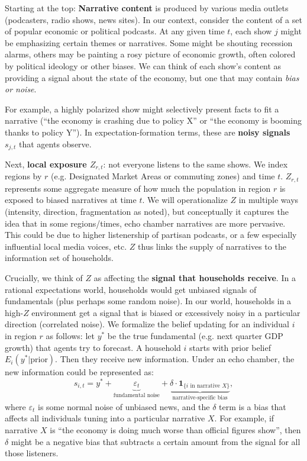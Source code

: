 \documentclass[12pt]{article}
\begin{document}
Starting at the top: \textbf{Narrative content} is produced by various media outlets (podcasters, radio shows, news sites). In our context, consider the content of a set of popular economic or political podcasts. At any given time $t$, each show $j$ might be emphasizing certain themes or narratives. Some might be shouting recession alarms, others may be painting a rosy picture of economic growth, often colored by political ideology or other biases. We can think of each show's content as providing a signal about the state of the economy, but one that may contain \textit{bias or noise}.

For example, a highly polarized show might selectively present facts to fit a narrative (“the economy is crashing due to policy X” or “the economy is booming thanks to policy Y”). In expectation-formation terms, these are \textbf{noisy signals} $s_{j,t}$ that agents observe.

Next, \textbf{local exposure $Z_{r,t}$}: not everyone listens to the same shows. We index regions by $r$ (e.g. Designated Market Areas or commuting zones) and time $t$. $Z_{r,t}$ represents some aggregate measure of how much the population in region $r$ is exposed to biased narratives at time $t$. We will operationalize $Z$ in multiple ways (intensity, direction, fragmentation as noted), but conceptually it captures the idea that in some regions/times, echo chamber narratives are more pervasive. This could be due to higher listenership of partisan podcasts, or a few especially influential local media voices, etc. $Z$ thus links the supply of narratives to the information set of households.

Crucially, we think of $Z$ as affecting the \textbf{signal that households receive}. In a rational expectations world, households would get unbiased signals of fundamentals (plus perhaps some random noise). In our world, households in a high-$Z$ environment get a signal that is biased or excessively noisy in a particular direction (correlated noise). We formalize the belief updating for an individual $i$ in region $r$ as follows: let $y^*$ be the true fundamental (e.g. next quarter GDP growth) that agents try to forecast. A household $i$ starts with prior belief $E_{i}(y^*| \text{prior})$. Then they receive new information. Under an echo chamber, the new information could be represented as:
\[
    s_{i,t} = y^* + \underbrace{\varepsilon_{t}}_{\text{fundamental noise}} + \underbrace{\delta \cdot \mathbf{1}_{\{i \text{ in narrative } X \}}}_{\text{narrative-specific bias}},
\]
where $\varepsilon_t$ is some normal noise of unbiased news, and the $\delta$ term is a bias that affects all individuals tuning into a particular narrative $X$. For example, if narrative $X$ is ``the economy is doing much worse than official figures show'', then $\delta$ might be a negative bias that subtracts a certain amount from the signal for all those listeners.
\end{document}
